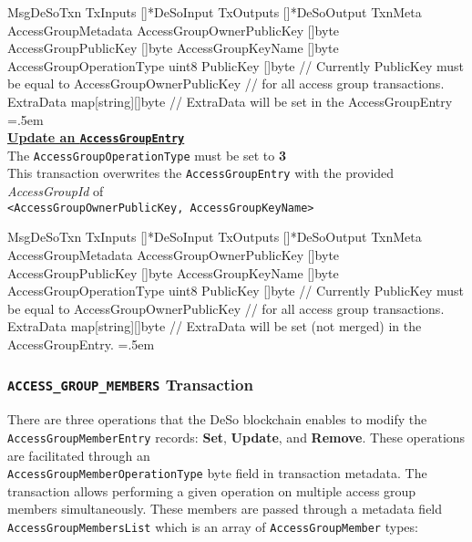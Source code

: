 \documentclass[oneside, 12pt]{article}
\newenvironment{lcverbatim}
 {\SaveVerbatim{cverb}}
 {\endSaveVerbatim
  \flushleft\fboxrule=0pt\fboxsep=.5em
  \colorbox{cverbbg}{%
    \makebox[\dimexpr\linewidth-2\fboxsep][l]{\BUseVerbatim{cverb}}%
  }
  \endflushleft
}
\newcommand{\ctexttt}[1]{\colorbox{cverbbg}{\texttt{#1}}}
\begin{document}
\begin{lcverbatim}
MsgDeSoTxn
{
    TxInputs  []*DeSoInput
    TxOutputs []*DeSoOutput
    TxnMeta   AccessGroupMetadata {
        AccessGroupOwnerPublicKey []byte
        AccessGroupPublicKey      []byte
        AccessGroupKeyName        []byte
        AccessGroupOperationType  uint8
    }
    PublicKey []byte
        // Currently PublicKey must be equal to AccessGroupOwnerPublicKey
        // for all access group transactions.
    ExtraData map[string][]byte
        // ExtraData will be set in the AccessGroupEntry
}
\end{lcverbatim}
\ \\
\noindent\underline{\textbf{Update an \texttt{AccessGroupEntry}}}\\
The \ctexttt{AccessGroupOperationType} must be set to \textbf{3}\\
\noindent This transaction overwrites the \texttt{AccessGroupEntry} with the provided \textit{AccessGroupId} of \\\texttt{<AccessGroupOwnerPublicKey, AccessGroupKeyName>}

\begin{lcverbatim}
MsgDeSoTxn
{
    TxInputs  []*DeSoInput
    TxOutputs []*DeSoOutput
    TxnMeta   AccessGroupMetadata {
        AccessGroupOwnerPublicKey []byte
        AccessGroupPublicKey      []byte
        AccessGroupKeyName        []byte
        AccessGroupOperationType  uint8
    }
    PublicKey []byte
        // Currently PublicKey must be equal to AccessGroupOwnerPublicKey
        // for all access group transactions.
    ExtraData map[string][]byte
        // ExtraData will be set (not merged) in the AccessGroupEntry.
}
\end{lcverbatim}

\subsubsection{\texttt{ACCESS\_GROUP\_MEMBERS} Transaction}
There are three operations that the DeSo blockchain enables to modify the \texttt{AccessGroupMemberEntry} records: \textbf{Set}, \textbf{Update}, and \textbf{Remove}. These operations are facilitated through an \\\texttt{AccessGroupMemberOperationType} byte field in transaction metadata. The transaction allows performing a given operation on multiple access group members simultaneously. These members are passed through a metadata field \texttt{AccessGroupMembersList} which is an array of \texttt{AccessGroupMember} types:
\end{document}
